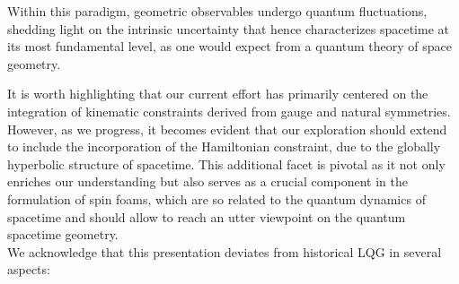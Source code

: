 Within this paradigm, geometric observables undergo quantum fluctuations, shedding light on the intrinsic uncertainty that hence characterizes spacetime at its most fundamental level, as one would expect from a quantum theory of space geometry. 

It is worth highlighting that our current effort has primarily centered on the integration of kinematic constraints derived from gauge and natural symmetries. However, as we progress, it becomes evident that our exploration should extend to include the incorporation of the Hamiltonian constraint, due to the globally hyperbolic structure of spacetime. This additional facet is pivotal as it not only enriches our understanding but also serves as a crucial component in the formulation of spin foams, which are so related to the quantum dynamics of spacetime and should allow to reach an utter viewpoint on the quantum spacetime geometry.\\

We acknowledge that this presentation deviates from historical LQG in several aspects:

